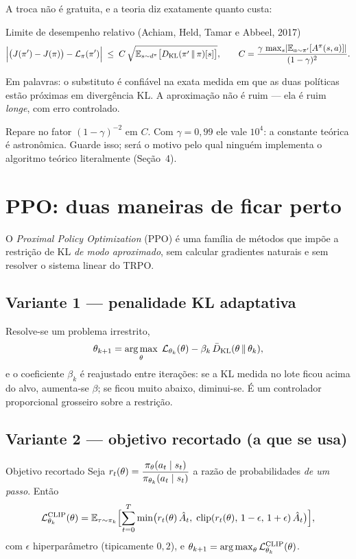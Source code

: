 \documentclass[11pt]{article}
\newcommand{\thv}{\theta}
\newcommand{\thk}{\thv_k}
\newcommand{\polth}{\pol_{\thv}}
\newcommand{\polk}{\pol_{k}}
\newcommand{\polnovo}{\pol'}
\newcommand{\traj}{\tau}
\newcommand{\Ahat}{\hat{A}}
\newcommand{\Advpi}{A^{\pol}}
\newcommand{\Dkl}{D_{\mathrm{KL}}}
\newcommand{\dpi}{d^{\pol}}
\newcommand{\Lsub}[1]{\mathcal{L}_{#1}}
\DeclareMathOperator{\clip}{clip}
\newcommand{\razao}{r_t(\thv)}
\newcommand{\Lclip}{\mathcal{L}^{\mathrm{CLIP}}}
\begin{document}
A troca não é gratuita, e a teoria diz exatamente quanto custa:

\begin{teobox}{Limite de desempenho relativo (Achiam, Held, Tamar e Abbeel, 2017)}
  \[
    \Bigl| \bigl(J(\polnovo) - J(\pol)\bigr) - \Lsub{\pol}(\polnovo) \Bigr|
      \;\le\; C\,\sqrt{\E_{s\sim\dpi}\bigl[\Dkl(\polnovo\,\|\,\pol)[s]\bigr]},
    \qquad
    C = \frac{\gamma\,\max_{s}\abs*{\E_{a\sim\polnovo}[\Advpi(s,a)]}}{(1-\gamma)^2}.
  \]
\end{teobox}

Em palavras: o substituto é confiável na exata medida em que as duas políticas estão
próximas em divergência KL. A aproximação não é ruim --- ela é ruim \emph{longe}, com
erro controlado.

\begin{ideiabox}
  Repare no fator $(1-\gamma)^{-2}$ em $C$. Com $\gamma = 0{,}99$ ele vale $10^4$: a
  constante teórica é astronômica. Guarde isso; será o motivo pelo qual ninguém
  implementa o algoritmo teórico literalmente (Seção~4).
\end{ideiabox}

\section{PPO: duas maneiras de ficar perto}

O \emph{Proximal Policy Optimization} (PPO) é uma família de métodos que impõe a
restrição de KL \emph{de modo aproximado}, sem calcular gradientes naturais e sem
resolver o sistema linear do TRPO.

\subsection{Variante 1 --- penalidade KL adaptativa}

Resolve-se um problema irrestrito,
\[
  \thv_{k+1} = \argmax_{\thv}\;\Lsub{\thk}(\thv)
    - \beta_k\,\bar D_{\mathrm{KL}}(\thv\,\|\,\thk),
\]
e o coeficiente $\beta_k$ é reajustado entre iterações: se a KL medida no lote ficou
acima do alvo, aumenta-se $\beta$; se ficou muito abaixo, diminui-se. É um controlador
proporcional grosseiro sobre a restrição.

\subsection{Variante 2 --- objetivo recortado (a que se usa)}

\begin{defbox}{Objetivo recortado}
  Seja $\razao = \dfrac{\polth(a_t\mid s_t)}{\pol_{\thk}(a_t\mid s_t)}$ a razão de
  probabilidades \emph{de um passo}. Então
  \[
    \Lclip_{\thk}(\thv) = \E_{\traj\sim\polk}\Bigl[\sum_{t=0}^{T}
      \min\bigl(\razao\,\Ahat_t,\;\clip(\razao,\,1-\epsilon,\,1+\epsilon)\,\Ahat_t\bigr)\Bigr],
  \]
  com $\epsilon$ hiperparâmetro (tipicamente $0{,}2$), e
  $\thv_{k+1} = \argmax_{\thv}\Lclip_{\thk}(\thv)$.
\end{defbox}
\end{document}
